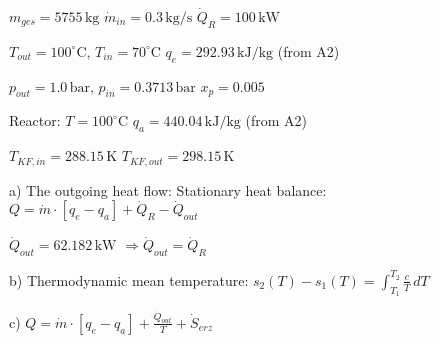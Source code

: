 \( m_{ges} = 5755 \, \text{kg} \)  
\( \dot{m}_{in} = 0.3 \, \text{kg/s} \)  
\( \dot{Q}_R = 100 \, \text{kW} \)  

\( T_{out} = 100^\circ \text{C} \), \( T_{in} = 70^\circ \text{C} \)  
\( q_e = 292.93 \, \text{kJ/kg} \) (from A2)  

\( p_{out} = 1.0 \, \text{bar}, \, p_{in} = 0.3713 \, \text{bar} \)  
\( x_p = 0.005 \)  

Reactor: \( T = 100^\circ \text{C} \)  
\( q_a = 440.04 \, \text{kJ/kg} \) (from A2)  

\( T_{KF,in} = 288.15 \, \text{K} \)  
\( T_{KF,out} = 298.15 \, \text{K} \)  

a) The outgoing heat flow:  
Stationary heat balance:  
\( Q = \dot{m} \cdot [q_e - q_a] + \dot{Q}_R - \dot{Q}_{out} \)  

\( \dot{Q}_{out} = 62.182 \, \text{kW} \)  
\( \Rightarrow \dot{Q}_{out} = \dot{Q}_R \)  

b) Thermodynamic mean temperature:  
\( s_2(T) - s_1(T) = \int_{T_1}^{T_2} \frac{c}{T} \, dT \)  

c) \( Q = \dot{m} \cdot [q_e - q_a] + \frac{\dot{Q}_{out}}{T} + \dot{S}_{erz} \)